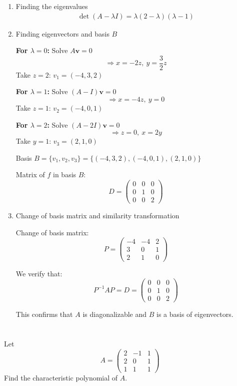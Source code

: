 \documentclass[12pt]{article}
\begin{document}
\begin{correctionbox}
    \begin{enumerate}
        \item Finding the eigenvalues
\begin{align*}
\det(A - \lambda I) = \lambda(2-\lambda)(\lambda - 1)
\end{align*}

    \item Finding eigenvectors and basis \(B\)

\textbf{For \(\lambda = 0\):} Solve \(A\mathbf{v} = 0\)
\[
\Rightarrow x = -2z,\ y = \frac{3}{2}z
\]
Take \(z = 2\): \(v_1 = (-4, 3, 2)\)

\textbf{For \(\lambda = 1\):} Solve \((A - I)\mathbf{v} = 0\)
\[
\Rightarrow x = -4z,\ y = 0
\]
Take \(z = 1\): \(v_2 = (-4, 0, 1)\)

\textbf{For \(\lambda = 2\):} Solve \((A - 2I)\mathbf{v} = 0\)
\[
\Rightarrow z = 0,\ x = 2y
\]
Take \(y = 1\): \(v_3 = (2, 1, 0)\)

Basis \(B = \{v_1, v_2, v_3\} = \{(-4,3,2), (-4,0,1), (2,1,0)\}\)

Matrix of \(f\) in basis \(B\):
\[
D = \begin{pmatrix}
0 & 0 & 0 \\
0 & 1 & 0 \\
0 & 0 & 2
\end{pmatrix}
\]

    \item Change of basis matrix and similarity transformation

Change of basis matrix:
\[
P = \begin{pmatrix}
-4 & -4 & 2 \\
3 & 0 & 1 \\
2 & 1 & 0
\end{pmatrix}
\]

We verify that:
\[
P^{-1}AP = D = \begin{pmatrix}
0 & 0 & 0 \\
0 & 1 & 0 \\
0 & 0 & 2
\end{pmatrix}
\]

This confirms that \(A\) is diagonalizable and \(B\) is a basis of eigenvectors.
    \end{enumerate}
\end{correctionbox}

\section{}
Let 
\[
A = \begin{pmatrix}
2 & -1 & 1 \\
2 & 0 & 1 \\
1 & 1 & 1
\end{pmatrix}
\]
Find the characteristic polynomial of \( A \).
\end{document}
